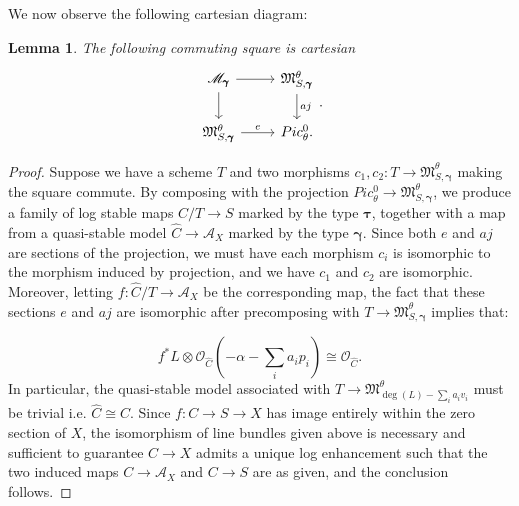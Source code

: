 \documentclass[12pt, oneside]{amsart}   	%
\newcounter{thm}
\newtheorem{lemma}[thm]{Lemma}
\numberwithin{equation}{section}
\numberwithin{thm}{section}
\numberwithin{figure}{section}
\begin{document}
We now observe the following cartesian diagram:
\begin{lemma}\label{cartprod}
The following commuting square is cartesian
\begin{equation}\label{cartdiag}
\begin{tikzcd}
\mathscr{M}_{\pmb\gamma} \arrow{r} \arrow{d} & \mathfrak{M}_{S,\pmb\gamma}^{\theta}\arrow[d,"aj"]\\
\mathfrak{M}_{S,\pmb\gamma}^{\theta} \arrow[r,"e"]&Pic^0_{\theta}.
\end{tikzcd}.
\end{equation}
\end{lemma}
\begin{proof}
Suppose we have a scheme $T$ and two morphisms $c_1,c_2: T \rightarrow \mathfrak{M}^{\theta}_{S,\pmb\gamma}$ making the square commute. By composing with the projection $Pic^0_{\theta} \rightarrow \mathfrak{M}^{\theta}_{S,\pmb\gamma}$, we produce a family of log stable maps $C/T \rightarrow S$ marked by the type $\pmb\tau$, together with a map from a quasi-stable model $\widehat{C} \rightarrow \mathcal{A}_X$ marked by the type $\pmb\gamma$. Since both $e$ and $aj$ are sections of the projection, we must have each morphism $c_i$ is isomorphic to the morphism induced by projection, and we have $c_1$ and $c_2$ are isomorphic. Moreover, letting $f: \widehat{C}/T \rightarrow \mathcal{A}_X$ be the corresponding map, the fact that these sections $e$ and $aj$ are isomorphic after precomposing with $T \rightarrow \mathfrak{M}^{\theta}_{S,\pmb\gamma}$ implies that:

\[f^*L\otimes \mathcal{O}_{\widehat{C}}(-\alpha - \sum_i a_ip_i) \cong\mathcal{O}_{\widehat{C}}.\]
In particular, the quasi-stable model associated with $T \rightarrow \mathfrak{M}^{\theta}_{\deg(L) - \sum_{i}a_iv_i}$ must be trivial i.e. $\widehat{C} \cong C$. Since $f: C \rightarrow S \rightarrow X$ has image entirely within the zero section of $X$, the isomorphism of line bundles given above is necessary and sufficient to guarantee $C \rightarrow X$ admits a unique log enhancement such that the two induced maps $C\rightarrow \mathcal{A}_X$ and $C \rightarrow S$ are as given, and the conclusion follows.
\end{proof}
\end{document}
